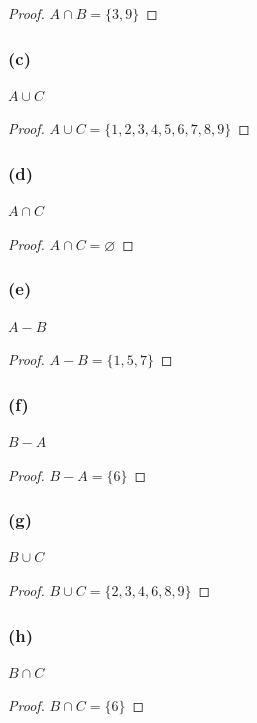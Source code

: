 \documentclass[14pt]{extarticle}
\newcommand{\es}{\varnothing}
\begin{document}
\begin{proof}
\(A \cap B = \{3, 9\}\)
\end{proof}

\subsubsection{(c)}
\(A \cup C\)

\begin{proof}
\(A \cup C = \{1, 2, 3, 4, 5, 6, 7, 8, 9\}\)
\end{proof}

\subsubsection{(d)}
\(A \cap C\)

\begin{proof}
\(A \cap C = \es\)
\end{proof}

\subsubsection{(e)}
\(A - B\)

\begin{proof}
\(A - B = \{1, 5, 7\}\)
\end{proof}

\subsubsection{(f)}
\(B - A\)

\begin{proof}
\(B - A = \{6\}\)
\end{proof}

\subsubsection{(g)}
\(B \cup C\)

\begin{proof}
\(B \cup C = \{2, 3, 4, 6, 8, 9\}\)
\end{proof}

\subsubsection{(h)}
\(B \cap C\)

\begin{proof}
\(B \cap C = \{6\}\)
\end{proof}
\end{document}
